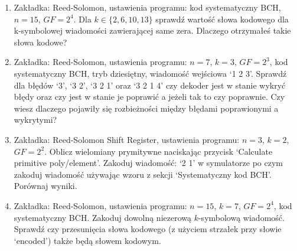 \begin{enumerate}
    \item Zakładka: Reed-Solomon, ustawienia programu: kod systematyczny BCH, $n=15$, $GF=2^4$.
    Dla $k \in \{ 2, 6, 10, 13 \}$ sprawdź wartość słowa kodowego dla k-symbolowej wiadomości zawierającej same zera. Dlaczego otrzymałeś takie słowa kodowe?
    \item Zakładka: Reed-Solomon, ustawienia programu: $n = 7$, $k = 3$, $GF = 2^3$,
    kod systematyczny BCH, tryb dziesiętny, wiadomość wejściowa `1 2 3'.
    Sprawdź dla błędów `3', `3 2', `3 2 1' oraz `3 2 1 4' czy dekoder jest w stanie
    wykryć błędy oraz czy jest w stanie je poprawić a jeżeli tak to czy poprawnie.
    Czy wiesz dlaczego pojawiły się rozbieżności między błędami poprawionymi a wykrytymi?
    \item Zakładka: Reed-Solomon Shift Register, ustawienia programu:
    $n = 3$, $k = 2$, $GF = 2^2$. Oblicz wielomiany prymitywne naciskając przycisk
    `Calculate primitive poly/element'.
    Zakoduj wiadomość: `2 1' w symulatorze po czym zakoduj wiadomość
    używając wzoru z sekcji `Systematyczny kod BCH'. Porównaj wyniki.
    \item Zakładka: Reed-Solomon, ustawienia programu: $n = 15$, $k=7$, $GF = 2^4$,
    kod systematyczny BCH.
    Zakoduj dowolną niezerową $k$-symbolową wiadomość. Sprawdź czy przesunięcia słowa kodowego
    (z użyciem strzałek przy słowie `encoded') także będą słowem kodowym.
\end{enumerate}
